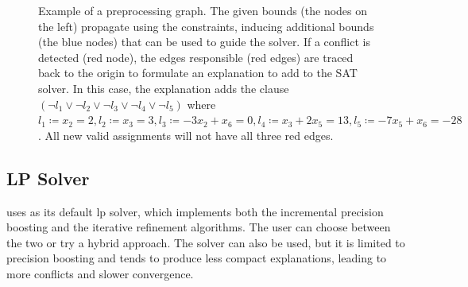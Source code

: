\documentclass[runningheads]{llncs}
\begin{document}
\begin{figure}[h]
    \caption{Example of a preprocessing graph. The given bounds (the nodes on the left) propagate using the constraints, inducing additional bounds (the blue nodes) that can be used to guide the solver.
        If a conflict is detected (red node), the edges responsible (red edges) are traced back to the origin to formulate an explanation to add to the SAT solver.
        In this case, the explanation adds the clause $(\neg l_1 \lor \neg l_2 \lor \neg l_3 \lor \neg l_4 \lor \neg l_5)$ where $l_1 \coloneqq x_2 = 2, l_2 \coloneqq x_3 = 3, l_3 \coloneqq -3x_2 + x_6 = 0, l_4 \coloneqq x_3 + 2x_5 = 13, l_5 \coloneqq -7x_5 + x_6 = -28$.
        All new valid assignments will not have all three red edges.}
    \label{dg:preprocessor}
\end{figure}

\subsection{LP Solver}

\dlinear uses \soplex \cite{soplex} as its default \gls{lp} solver, which implements both the incremental precision boosting and the iterative refinement algorithms.
The user can choose between the two or try a hybrid approach. The \qsoptex \cite{ref:precision-boosting} solver can also be used, but it is limited to precision boosting and tends to produce less compact explanations, leading to more conflicts and slower convergence.
\end{document}
